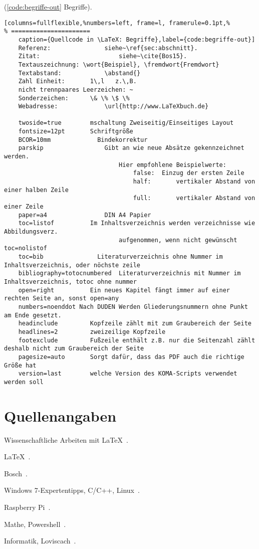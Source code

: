 (\autoref{code:begriffe-out} Begriffe).
\lstset{language=[LaTeX]TeX} %
\begin{lstlisting}[columns=fullflexible,%numbers=left, frame=l, framerule=0.1pt,%
% ======================
	caption={Quellcode in \LaTeX: Begriffe},label={code:begriffe-out}]
	Referenz: 				siehe~\ref{sec:abschnitt}.
	Zitat: 						siehe~\cite{Bos15}.
	Textauszeichnung: \wort{Beispiel}, \fremdwort{Fremdwort}
	Textabstand: 			\abstand{}
	Zahl Einheit: 		1\,l   z.\,B.
	nicht trennpaares Leerzeichen: ~
	Sonderzeichen: 		\& \% \$ \%
	Webadresse:				\url{http://www.LaTeXbuch.de}

	twoside=true		mschaltung Zweiseitig/Einseitiges Layout
	fontsize=12pt		Schriftgröße
	BCOR=10mm			  Bindekorrektur
	parskip					Gibt an wie neue Absätze gekennzeichnet werden.
								Hier empfohlene Beispielwerte:
									false:	Einzug der ersten Zeile
									half:		vertikaler Abstand von einer halben Zeile
									full:		vertikaler Abstand von einer Zeile
	paper=a4				DIN A4 Papier
	toc=listof			Im Inhaltsverzeichnis werden verzeichnisse wie Abbildungsverz.
								aufgenommen, wenn nicht gewünscht toc=nolistof
	toc=bib				  Literaturverzeichnis ohne Nummer im Inhaltsverzeichnis, oder nöchste zeile
	bibliography=totocnumbered	Literaturverzeichnis mit Nummer im Inhaltsverzeichnis, totoc ohne nummer
	open=right			Ein neues Kapitel fängt immer auf einer rechten Seite an, sonst open=any
	numbers=noenddot Nach DUDEN Werden Gliederungsnummern ohne Punkt am Ende gesetzt.
	headinclude			Kopfzeile zählt mit zum Graubereich der Seite
	headlines=2			zweizeilige Kopfzeile
	footexclude			Fußzeile enthält z.B. nur die Seitenzahl zählt deshalb nicht zum Graubereich der Seite
	pagesize=auto		Sorgt dafür, dass das PDF auch die richtige Größe hat
	version=last		welche Version des KOMA-Scripts verwendet werden soll
\end{lstlisting}

\newpage

\section{Quellenangaben}

Wissenschaftliche Arbeiten mit \LaTeX~\cite{Schlosser201609}.

\LaTeX~\cite{Schlosser201609,Schlosser:Webseite}.

Bosch~\cite{Bosch:AutomotiveCampus}.

Windows 7-Expertentipps, C/C++, Linux~\cite{Joos201202,KaiserGuddat201410,Kofler:Webseite}.

Raspberry Pi~\cite{KoflerKuehnastScherbeck201508,Kofler201511}.

Mathe, Powershell~\cite{WalzZeilfelderRiessinger201103,Weltner201301}.

Informatik, Loviscach~\cite{KuevelerSchwoch200907,Loviscach:Webseite,Riessinger201308}.
